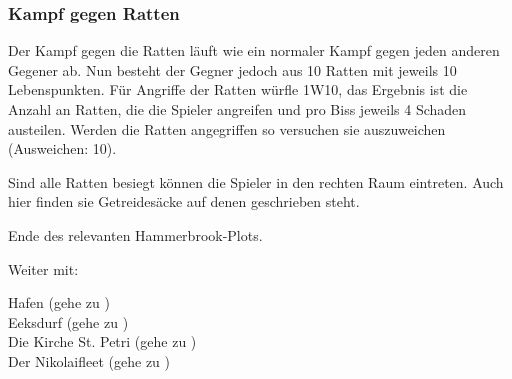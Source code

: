 \subsubsection{Kampf gegen Ratten}
\label{kampf3}

Der Kampf gegen die Ratten läuft wie ein normaler Kampf gegen jeden anderen Gegener ab. Nun besteht der Gegner jedoch aus 10 Ratten mit jeweils 10 Lebenspunkten. Für Angriffe der Ratten würfle 1W10, das Ergebnis ist die Anzahl an Ratten, die die Spieler angreifen und pro Biss jeweils 4 Schaden austeilen. Werden die Ratten angegriffen so versuchen sie auszuweichen (Ausweichen: 10).


Sind alle Ratten besiegt können die Spieler in den rechten Raum eintreten. Auch hier finden sie Getreidesäcke auf denen  geschrieben steht.

Ende des relevanten Hammerbrook-Plots.

Weiter mit:

Hafen (gehe zu \blue{\ref{Hafen}}) \\
Eeksdurf (gehe zu \blue{\ref{xd}}) \\
Die Kirche St. Petri (gehe zu \blue{\ref{Petri}}) \\
Der Nikolaifleet (gehe zu \blue{\ref{Fleet}}) \\
